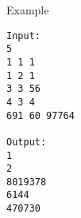 Example
\begin{verbatim}
Input:
5
1 1 1
1 2 1
3 3 56
4 3 4
691 60 97764

Output:
1
2
8019378
6144
470730 
\end{verbatim}